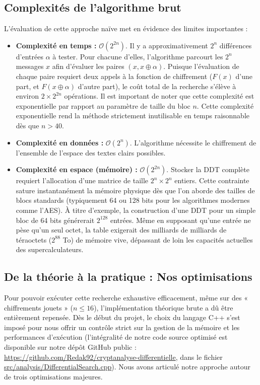 \documentclass[a4paper,11pt]{article}
\begin{document}
\subsection{Complexités de l'algorithme brut}
L'évaluation de cette approche naïve met en évidence des limites importantes :
\begin{itemize}
    \item \textbf{Complexité en temps :} $\mathcal{O}(2^{2n})$. Il y a approximativement $2^n$ différences d'entrées $\alpha$ à tester. Pour chacune d'elles, l'algorithme parcourt les $2^n$ messages $x$ afin d'évaluer les paires $(x, x \oplus \alpha)$. Puisque l'évaluation de chaque paire requiert deux appels à la fonction de chiffrement ($F(x)$ d'une part, et $F(x \oplus \alpha)$ d'autre part), le coût total de la recherche s'élève à environ $2 \times 2^{2n}$ opérations. Il est important de noter que cette complexité est exponentielle par rapport au paramètre de taille du bloc $n$. Cette complexité exponentielle rend la méthode strictement inutilisable en temps raisonnable dès que $n > 40$. 
    \item \textbf{Complexité en données :} $\mathcal{O}(2^n)$. L'algorithme nécessite le chiffrement de l'ensemble de l'espace des textes clairs possibles.
    \item \textbf{Complexité en espace (mémoire) :} $\mathcal{O}(2^{2n})$. Stocker la DDT complète requiert l'allocation d'une matrice de taille $2^n \times 2^n$ entiers. Cette contrainte sature instantanément la mémoire physique dès que l'on aborde des tailles de blocs standards (typiquement 64 ou 128 bits pour les algorithmes modernes comme l'AES). À titre d'exemple, la construction d'une DDT pour un simple bloc de 64 bits générerait $2^{128}$ entrées. Même en supposant qu'une entrée ne pèse qu'un seul octet, la table exigerait des milliards de milliards de téraoctets ($2^{88}$ To) de mémoire vive, dépassant de loin les capacités actuelles des supercalculateurs.
\end{itemize}

\subsection{De la théorie à la pratique : Nos optimisations}

Pour pouvoir exécuter cette recherche exhaustive efficacement, même sur des « chiffrements jouets » ($n \le 16$), l'implémentation théorique brute a dû être entièrement repensée. Dès le début du projet, le choix du langage C++ s'est imposé pour nous offrir un contrôle strict sur la gestion de la mémoire et les performances d'exécution (l'intégralité de notre code source optimisé est disponible sur notre dépôt GitHub public : \url{https://github.com/Redak92/cryptanalyse-differentielle}, dans le fichier \url{src/analysis/DifferentialSearch.cpp}). Nous avons articulé notre approche autour de trois optimisations majeures.
\end{document}
